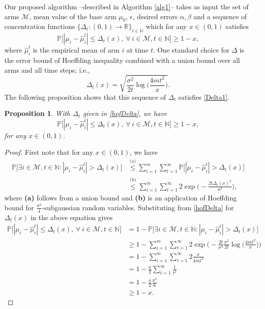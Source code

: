 \documentclass[12pt]{article}
\def\P{\mathbb{P}}
\def\N{\mathbb{N}}
\def\N{\mathbb{N}}
\def\MM{\mathcal{M}}
\newtheorem{proposition}[theorem]{Proposition}
\begin{document}
Our proposed algorithm --described in Algorithm \ref{alg1}-- takes as input the set of arms $\MM$, mean value of the base arm $\mu_0$, $\epsilon$, desired  errors $\alpha, \beta$ and a sequence of concentration functions $\Big\{\Delta_t:(0,1)\to\mathbb{R}\Big\}_{t\in\mathbb{N}}$ which for any $x\in(0,1)$ satisfies 
\begin{equation}
\label{Delta1}
\P\big[|\mu_i-\hat\mu_i^t|\leq\Delta_t(x),~\forall~i\in\MM,t\in \mathbb{N}\big]\geq 1-x,
\end{equation}
where $\hat\mu_i^t$ is the empirical mean of arm $i$ at time $t$. 
One standard choice for $\Delta$ is the error bound of Hoeffding inequality combined with a union bound over all arms and all time steps; i.e., 
\begin{equation}
\label{hofDelta}
\Delta_t(x) = \sqrt{\frac{\sigma^2}{2t}\log\Big(\frac{4mt^2}{x}\Big)}.
\end{equation}
The following proposition shows that this sequence of $\Delta_t$ satisfies \eqref{Delta1}. 
\begin{proposition}
With $\Delta_t$ given in \eqref{hofDelta}, we have
$$\P\big[|\mu_i-\hat\mu_i^t|\leq\Delta_t(x),~\forall~i\in\MM,t\in \mathbb{N}\big]\geq 1-x,$$
for any $x\in(0,1)$.
\end{proposition}
\begin{proof}

First note that for any $x\in(0,1)$, we have
$$\begin{aligned}
\P\big[\exists i\in\MM,t\in\N: |\mu_i - \hat\mu^t_i|>\Delta_t(x)\big] &\stackrel{\text{(a)}}{ \leq} \sum_{i=1}^m \sum_{t=1}^\infty \P\big[ |\mu_i - \hat\mu^t_i|>\Delta_t(x)\big]\\
&\stackrel{\text{(b)}}{\leq}  \sum_{i=1}^m \sum_{t=1}^\infty 2\exp\bigg(-\frac{2t\Delta_t(x)^2}{\sigma^2}\bigg),
\end{aligned}$$
where {\bf (a)} follows from a union bound and {\bf (b)} is an application of Hoeffding bound for $\frac{\sigma^2}{4}$-subgaussian random variables. Substituting from \eqref{hofDelta} for $\Delta_t(x)$ in the above equation gives
$$
\begin{aligned}
\P\big[|\mu_i-\hat\mu_i^t|\leq\Delta_t(x),~\forall~i\in\MM,t\in \mathbb{N}\big] & = 1- \P\big[\exists i\in\MM,t\in\N: |\mu_i - \hat\mu^t_i|>\Delta_t(x)\big]\\
&\geq 1- \sum_{i=1}^m \sum_{t=1}^\infty 2 \exp\bigg(-\frac{2t}{\sigma^2}\frac{\sigma^2}{2t}\log\Big(\frac{4mt^2}{x}\Big)\bigg)\\
&= 1 - \sum_{i=1}^m \sum_{t=1}^\infty 2 \frac{x}{4mt^2} \\
& = 1 - \frac{x}{2}\sum_{t=1}^\infty \frac{1}{t^2} \\
& = 1 -  \frac{x}{2}\frac{\pi^2}{6}\\
& \geq 1 - x.
\end{aligned}$$
\end{proof}
\end{document}

